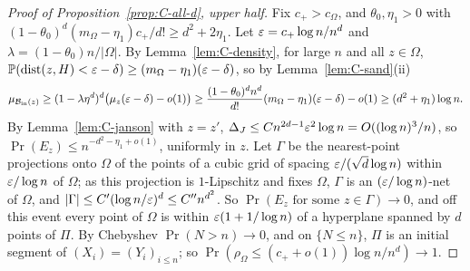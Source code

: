 \begin{proof}[Proof of Proposition~\ref{prop:C-all-d}, upper half]
Fix $c_+ > c_\Omega$, and $\theta_0, \eta_1 > 0$ with $(1 - \theta_0)^d(m_\Omega - \eta_1)c_+/d! \ge d^2 + 2\eta_1$. Let $\varepsilon = c_+\log n/n^d$ and
$\lambda = (1 - \theta_0)n/|\Omega|$. By Lemma~\ref{lem:C-density}, for large $n$ and all $z \in \Omega$,
$\mathbb{P}(\operatorname{dist}(z, H) < \varepsilon - \delta) \ge (m_\Omega - \eta_1)(\varepsilon - \delta)$, so by Lemma~\ref{lem:C-sand}(ii)
\[
  \mu_{\mathcal{B}_{\mathrm{in}}(z)} \ge (1 - \lambda\eta^d)^d\bigl(\mu_z(\varepsilon - \delta) - o(1)\bigr) \ge \frac{(1 - \theta_0)^dn^d}{d!}(m_\Omega - \eta_1)(\varepsilon - \delta) - o(1)
  \ge (d^2 + \eta_1)\log n.
\]
By Lemma~\ref{lem:C-janson} with $z = z'$, $\Delta_J \le Cn^{2d-1}\varepsilon^2\log n = O((\log n)^3/n)$, so
$\Pr(E_z) \le n^{-d^2 - \eta_1 + o(1)}$, uniformly in $z$. Let $\Gamma$ be the nearest-point projections onto $\Omega$ of the points
of a cubic grid of spacing $\varepsilon/(\sqrt d\log n)$ within $\varepsilon/\log n$ of $\Omega$; as this projection is $1$-Lipschitz and fixes
$\Omega$, $\Gamma$ is an $(\varepsilon/\log n)$-net of $\Omega$, and $|\Gamma| \le C'(\log n/\varepsilon)^d \le C''n^{d^2}$. So
$\Pr(E_z\text{ for some }z \in \Gamma) \to 0$, and off this event every point of $\Omega$ is within $\varepsilon(1 + 1/\log n)$ of a
hyperplane spanned by $d$ points of $\Pi$. By Chebyshev $\Pr(N > n) \to 0$, and on $\{N \le n\}$, $\Pi$ is an initial segment
of $(X_i) = (Y_i)_{i \le n}$; so $\Pr(\rho_\Omega \le (c_+ + o(1))\log n/n^d) \to 1$.
\end{proof}

